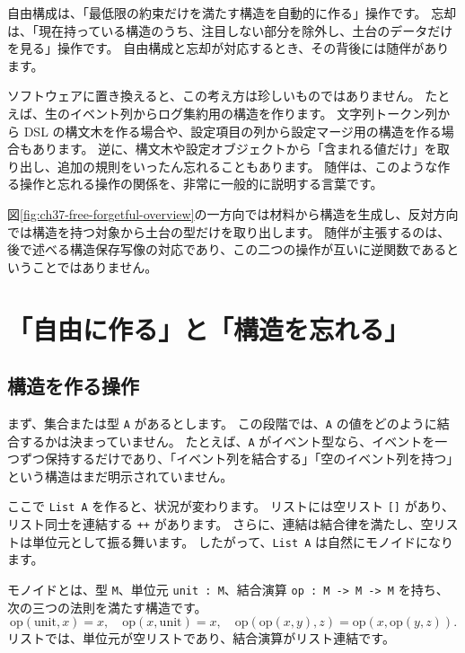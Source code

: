 自由構成は、「最低限の約束だけを満たす構造を自動的に作る」操作です。
忘却は、「現在持っている構造のうち、注目しない部分を除外し、土台のデータだけを見る」操作です。
自由構成と忘却が対応するとき、その背後には随伴があります。

ソフトウェアに置き換えると、この考え方は珍しいものではありません。
たとえば、生のイベント列からログ集約用の構造を作ります。
文字列トークン列から DSL の構文木を作る場合や、設定項目の列から設定マージ用の構造を作る場合もあります。
逆に、構文木や設定オブジェクトから「含まれる値だけ」を取り出し、追加の規則をいったん忘れることもあります。
随伴は、このような作る操作と忘れる操作の関係を、非常に一般的に説明する言葉です。


図\ref{fig:ch37-free-forgetful-overview}の一方向では材料から構造を生成し、反対方向では構造を持つ対象から土台の型だけを取り出します。
随伴が主張するのは、後で述べる構造保存写像の対応であり、この二つの操作が互いに逆関数であるということではありません。

\section{「自由に作る」と「構造を忘れる」}
\label{sec:ch37-free-forgetful}

\subsection{構造を作る操作}

まず、集合または型 \texttt{A} があるとします。
この段階では、\texttt{A} の値をどのように結合するかは決まっていません。
たとえば、\texttt{A} がイベント型なら、イベントを一つずつ保持するだけであり、「イベント列を結合する」「空のイベント列を持つ」という構造はまだ明示されていません。

ここで \texttt{List A} を作ると、状況が変わります。
リストには空リスト \texttt{[]} があり、リスト同士を連結する \texttt{++} があります。
さらに、連結は結合律を満たし、空リストは単位元として振る舞います。
したがって、\texttt{List A} は自然にモノイドになります。

モノイドとは、型 \texttt{M}、単位元 \texttt{unit : M}、結合演算 \texttt{op : M -> M -> M} を持ち、次の三つの法則を満たす構造です。
\[
  \mathrm{op}(\mathrm{unit}, x) = x,
  \quad
  \mathrm{op}(x, \mathrm{unit}) = x,
  \quad
  \mathrm{op}(\mathrm{op}(x,y),z) = \mathrm{op}(x,\mathrm{op}(y,z)).
\]
リストでは、単位元が空リストであり、結合演算がリスト連結です。

